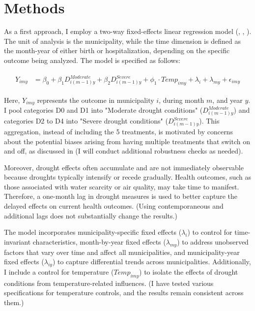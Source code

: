 \documentclass[12pt, oneside]{article}      %
\begin{document}
\section{Methods}

As a first approach, I employ a two-way fixed-effects linear regression model (\cite{Bailey2015}, \cite{Mullins2020}, \cite{Cohen2022}). The unit of analysis is the municipality, while the time dimension is defined as the month-year of either birth or hospitalization, depending on the specific outcome being analyzed. The model is specified as follows:

\begin{align}
\begin{aligned}
Y_{imy} &= \beta_0 + \beta_1 D^{Moderate}_{i(m-1)y} + \beta_2 D^{Severe}_{i(m-1)y} + \phi_1 \cdot Temp_{imy} + \lambda_i + \lambda_{my} + \epsilon_{imy}
\end{aligned}
\label{eq:twfe_basic}
\end{align}

Here, $Y_{imy}$ represents the outcome in municipality $i$, during month $m$, and year $y$. I pool categories D0 and D1 into "Moderate drought conditions" ($D^{Moderate}_{i(m-1)y}$) and categories D2 to D4 into "Severe drought conditions" ($D^{Severe}_{i(m-1)y}$). This aggregation, instead of including the 5 treatments, is motivated by concerns about the potential biases arising from having multiple treatments that switch on and off, as discussed in \cite{deChaisemartin2023} (I will conduct additional robustness checks as needed). 

Moreover, drought effects often accumulate and are not immediately observable because droughts typically intensify or recede gradually. Health outcomes, such as those associated with water scarcity or air quality, may take time to manifest. Therefore, a one-month lag in drought measures is used to better capture the delayed effects on current health outcomes. (Using contemporaneous and additional lags does not substantially change the results.)

The model incorporates municipality-specific fixed effects ($\lambda_i$) to control for time-invariant characteristics, month-by-year fixed effects ($\lambda_{my}$) to address unobserved factors that vary over time and affect all municipalities, and municipality-year fixed effects ($\lambda_{iy}$) to capture differential trends across municipalities. Additionally, I include a control for temperature ($Temp_{imy}$) to isolate the effects of drought conditions from temperature-related influences. (I have tested various specifications for temperature controls, and the results remain consistent across them.)
\end{document}

